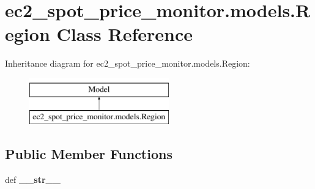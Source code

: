 \hypertarget{classec2__spot__price__monitor_1_1models_1_1Region}{\section{ec2\-\_\-spot\-\_\-price\-\_\-monitor.\-models.\-Region Class Reference}
\label{classec2__spot__price__monitor_1_1models_1_1Region}
}
Inheritance diagram for ec2\-\_\-spot\-\_\-price\-\_\-monitor.\-models.\-Region\-:\begin{figure}[H]
\begin{center}
\leavevmode
\includegraphics[height=2.000000cm]{classec2__spot__price__monitor_1_1models_1_1Region}
\end{center}
\end{figure}
\subsection*{Public Member Functions}
\begin{DoxyCompactItemize}
\item 
\hypertarget{classec2__spot__price__monitor_1_1models_1_1Region_aedca5fe6d840aa9e75acdfe6124fb0b7}{def {\bfseries \-\_\-\-\_\-str\-\_\-\-\_\-}}\label{classec2__spot__price__monitor_1_1models_1_1Region_aedca5fe6d840aa9e75acdfe6124fb0b7}

\end{DoxyCompactItemize}
